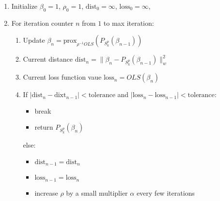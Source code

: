 \begin{enumerate}
    \item Initialize $\beta_0=1$, $\rho_0=1$, $\text{dist}_0=\infty$, $\text{loss}_0=\infty$,
    \item For iteration counter $n$ from $1$ to max iteration:
    \begin{enumerate}
        \item Update $\beta_n=\text{prox}_{\rho^{-1}OLS}(P_{S_k^p}(\beta_{n-1}))$
        \item Current distance $\text{dist}_n=\|\beta_n-P_{S_k^p}(\beta_{n-1})\|_w^2$
        \item Current loss function vaue $\text{loss}_n=OLS(\beta_n)$
        \item If $|\text{dist}_n-\text{dixt}_{n-1}|<\text{tolerance}$ and $|\text{loss}_n-\text{loss}_{n-1}|<\text{tolerance}$:
        \begin{itemize}
            \item break
            \item return $P_{S_k^p}(\beta_n)$
        \end{itemize}
        else:
        \begin{itemize}
            \item $\text{dist}_{n-1}=\text{dist}_n$
            \item $\text{loss}_{n-1}=\text{loss}_n$
            \item increase $\rho$ by a small multiplier $\alpha$ every few iterations
        \end{itemize}
    \end{enumerate}
\end{enumerate}

